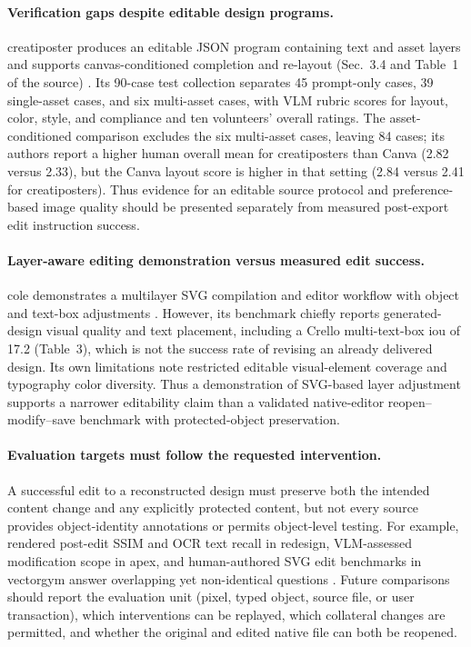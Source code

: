 \paragraph{Verification gaps despite editable design programs.}
\ac{creatiposter} produces an editable JSON program containing text and asset layers and supports canvas-conditioned completion and re-layout (Sec.~3.4 and Table~1 of the source) \citep{zhang2025creatiposter}.
Its 90-case test collection separates 45 prompt-only cases, 39 single-asset cases, and six multi-asset cases, with VLM rubric scores for layout, color, style, and compliance and ten volunteers' overall ratings.
The asset-conditioned comparison excludes the six multi-asset cases, leaving 84 cases; its authors report a higher human overall mean for \ac{creatiposters} than Canva (2.82 versus 2.33), but the Canva layout score is higher in that setting (2.84 versus 2.41 for \ac{creatiposters}).
Thus evidence for an editable source protocol and preference-based image quality should be presented separately from measured post-export edit instruction success.

\paragraph{Layer-aware editing demonstration versus measured edit success.}
\ac{cole} demonstrates a multilayer SVG compilation and editor workflow with object and text-box adjustments \citep{cole2023}.
However, its benchmark chiefly reports generated-design visual quality and text placement, including a Crello multi-text-box \ac{iou} of 17.2 (Table~3), which is not the success rate of revising an already delivered design.
Its own limitations note restricted editable visual-element coverage and typography color diversity.
Thus a demonstration of SVG-based layer adjustment supports a narrower editability claim than a validated native-editor reopen--modify--save benchmark with protected-object preservation.

\paragraph{Evaluation targets must follow the requested intervention.}
A successful edit to a reconstructed design must preserve both the intended content change and any explicitly protected content, but not every source provides object-identity annotations or permits object-level testing.
For example, rendered post-edit SSIM and OCR text recall in \ac{redesign}, VLM-assessed modification scope in \ac{apex}, and human-authored SVG edit benchmarks in \ac{vectorgym} answer overlapping yet non-identical questions \citep{redesign2026,apex2026,vectorgym2026}.
Future comparisons should report the evaluation unit (pixel, typed object, source file, or user transaction), which interventions can be replayed, which collateral changes are permitted, and whether the original and edited native file can both be reopened.

